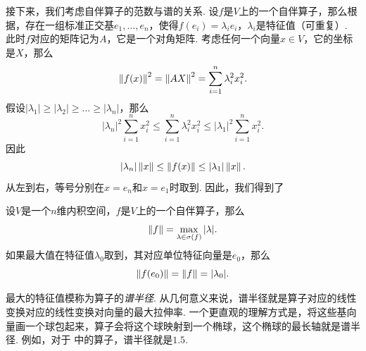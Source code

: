 接下来，我们考虑自伴算子的范数与谱的关系. 设$f$是$V$上的一个自伴算子，那么根据，存在一组标准正交基$e_1,\dots,e_n$，使得$f(e_i)=\lambda_i e_i$，$\lambda_i$是特征值（可重复）. 此时$f$对应的矩阵记为$A$，它是一个对角矩阵. 考虑任何一个向量$x\in V$，它的坐标是$X$，那么
\[
    \left\|f(x)\right\|^2=\left\|AX\right\|^2=\sum_{i=1}^n\lambda_i^2x_i^2.
\]
假设$|\lambda_1|\geq|\lambda_2|\geq\dots\geq|\lambda_n|$，那么
\[
    |\lambda_n|^2\sum_{i=1}^n x_i^2\leq \sum_{i=1}^n\lambda_i^2x_i^2\leq |\lambda_1|^2\sum_{i=1}^n x_i^2.
\]
因此
\[
    |\lambda_n|\left\|x\right\|\leq \left\|f(x)\right\|\leq |\lambda_1|\left\|x\right\|.
\]
从左到右，等号分别在$x=e_n$和$x=e_1$时取到. 因此，我们得到了

\begin{theorem}\label{theorem:symmetric-operator-norm}
    设$V$是一个$n$维内积空间，$f$是$V$上的一个自伴算子，那么
    \[\left\|f\right\|=\max_{\lambda\in\sigma(f)}|\lambda|.\]
    如果最大值在特征值$\lambda_0$取到，其对应单位特征向量是$e_0$，那么
    \[\left\|f(e_0)\right\|=\left\|f\right\|=|\lambda_0|.\]
\end{theorem}

最大的特征值模称为算子的\textit{谱半径}. 从几何意义来说，谱半径就是算子对应的线性变换对应的线性变换对向量的最大拉伸率. 一个更直观的理解方式是，将这些基向量画一个球包起来，算子会将这个球映射到一个椭球，这个椭球的最长轴就是谱半径. 例如，对于 中的算子，谱半径就是$1.5$. 